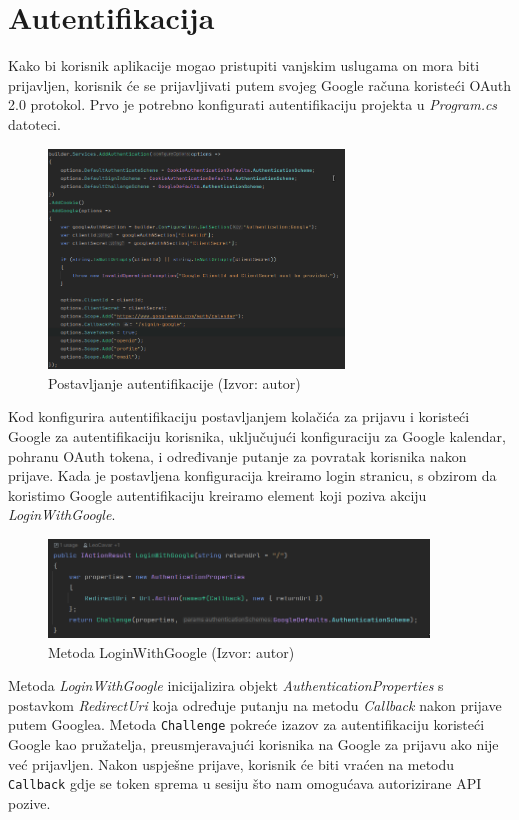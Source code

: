 \documentclass{foi}
\begin{document}
\section{Autentifikacija}
Kako bi korisnik aplikacije mogao pristupiti vanjskim uslugama on mora biti prijavljen, korisnik će se prijavljivati putem svojeg Google računa koristeći OAuth 2.0 protokol. Prvo je potrebno konfigurati autentifikaciju projekta u \textit{Program.cs} datoteci.
\begin{figure}[H]
    \centering
    \includegraphics[width=0.7\textwidth]{slike/auth.png}
    \caption{Postavljanje autentifikacije (Izvor: autor)}
    \label{fig:autentifikacija_programcs}
\end{figure} Kod konfigurira autentifikaciju postavljanjem kolačića za prijavu i koristeći Google za autentifikaciju korisnika, uključujući konfiguraciju za Google kalendar, pohranu OAuth tokena, i određivanje putanje za povratak korisnika nakon prijave.
Kada je postavljena konfiguracija kreiramo login stranicu, s obzirom da koristimo Google autentifikaciju kreiramo element koji poziva akciju \textit{LoginWithGoogle}.
\begin{figure}[H]
    \centering
    \includegraphics[width=0.9\textwidth]{slike/loginwithgoogle.png}
    \caption{Metoda LoginWithGoogle (Izvor: autor)}
    \label{fig:LoginWithGoogle}

\end{figure}
\newpage
Metoda \textit{LoginWithGoogle} inicijalizira objekt \textit{AuthenticationProperties} s postavkom \textit{RedirectUri} koja određuje putanju na metodu \textit{Callback} nakon prijave putem Googlea. Metoda \texttt{Challenge} pokreće izazov za autentifikaciju koristeći Google kao pružatelja, preusmjeravajući korisnika na Google za prijavu ako nije već prijavljen. Nakon uspješne prijave, korisnik će biti vraćen na metodu \texttt{Callback} gdje se token sprema u sesiju što nam omogućava autorizirane API pozive.
\end{document}
